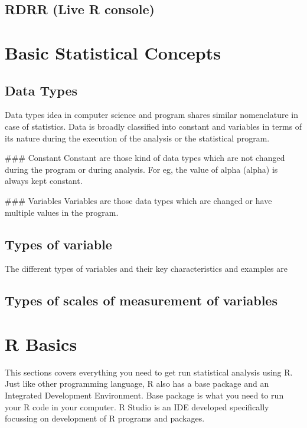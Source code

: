 \documentclass[
]{book}
\begin{document}
\hypertarget{rdrr-live-r-console}{%
\section{RDRR (Live R console)}\label{rdrr-live-r-console}}

\hypertarget{basic-statistical-concepts}{%
\chapter{Basic Statistical Concepts}\label{basic-statistical-concepts}}

\hypertarget{data-types}{%
\section{Data Types}\label{data-types}}

Data types idea in computer science and program shares similar nomenclature in case of statistics. Data is broadly classified into constant and variables in terms of its nature during the execution of the analysis or the statistical program.

\#\#\# Constant Constant are those kind of data types which are not changed during the program or during analysis. For eg, the value of alpha (alpha) is always kept constant.

\#\#\# Variables Variables are those data types which are changed or have multiple values in the program.

\hypertarget{types-of-variable}{%
\section{Types of variable}\label{types-of-variable}}

The different types of variables and their key characteristics and examples are

\hypertarget{types-of-scales-of-measurement-of-variables}{%
\section{Types of scales of measurement of variables}\label{types-of-scales-of-measurement-of-variables}}

\hypertarget{r-basics}{%
\chapter{R Basics}\label{r-basics}}

This sections covers everything you need to get run statistical analysis using R. Just like other programming language, R also has a base package and an Integrated Development Environment. Base package is what you need to run your R code in your computer. R Studio is an IDE developed specifically focussing on development of R programs and packages.
\end{document}
